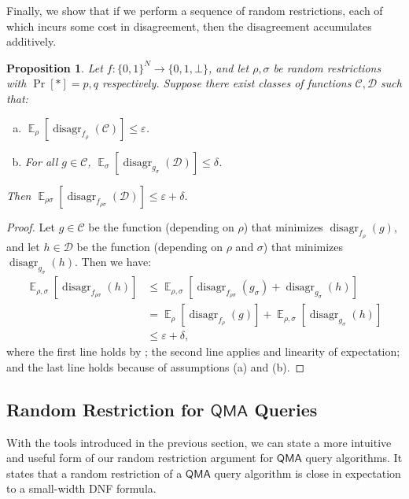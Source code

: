 \documentclass[10pt,a4paper]{article}
\newtheorem{proposition}[theorem]{Proposition}
\newcommand{\eps}{\varepsilon}
\newcommand{\E}{\mathop{\mathbb{E}}}
\DeclareMathOperator{\disagr}{\mathrm{disagr}}
\begin{document}
Finally, we show that if we perform a sequence of random restrictions, each of which incurs some cost in disagreement, then the disagreement accumulates additively.
\begin{proposition}
\label{prop:disagr_composing_restrictions}
Let $f: \{0,1\}^N \to \{0,1,\bot\}$, and let $\rho, \sigma$ be random restrictions with $\Pr[*] = p,q$ respectively. Suppose there exist classes of functions $\mathcal{C},\mathcal{D}$ such that:
\begin{enumerate}[(a)]
\item $\E_{\rho} \left[\disagr_{f_{\rho}}\left(\mathcal{C}\right)\right] \le \eps$.
\item For all $g \in \mathcal{C}$, $\E_\sigma \left[\disagr_{g_{\sigma}}\left(\mathcal{D}\right)\right] \le \delta$.
\end{enumerate}
Then $\E_{\rho \sigma} \left[\disagr_{f_{\rho \sigma}}\left(\mathcal{D}\right)\right] \le \eps + \delta$.
\end{proposition}
\begin{proof}
Let $g \in \mathcal{C}$ be the function (depending on $\rho$) that minimizes $\disagr_{f_\rho}(g)$, and let $h \in \mathcal{D}$ be the function (depending on $\rho$ and $\sigma$) that minimizes $\disagr_{g_\sigma}(h)$. Then we have:
\begin{align*}
\E_{\rho,\sigma}\left[\disagr_{f_{\rho \sigma}}(h)\right] &\le \E_{\rho,\sigma}\left[\disagr_{f_{\rho \sigma}}\left(g_\sigma\right) + \disagr_{g_{\sigma}}(h)\right]\\
&= \E_{\rho}\left[\disagr_{f_\rho}(g)\right] + \E_{\rho,\sigma}\left[\disagr_{g_\sigma}(h)\right]\\
&\le \eps + \delta,
\end{align*}
where the first line holds by ; the second line applies  and linearity of expectation; and the last line holds because of assumptions (a) and (b).
\end{proof}

\subsection{Random Restriction for \texorpdfstring{$\mathsf{QMA}$}{QMA} Queries}
With the tools introduced in the previous section, we can state a more intuitive and useful form of our random restriction argument for $\mathsf{QMA}$ query algorithms. It states that a random restriction of a $\mathsf{QMA}$ query algorithm is close in expectation to a small-width DNF formula.
\end{document}
